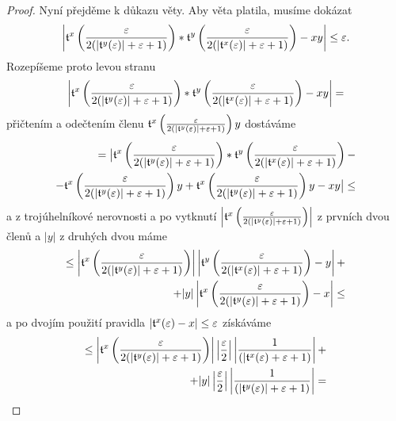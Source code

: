 \begin{theorem}
\begin{proof}
Nyní přejděme k důkazu věty. Aby věta platila, musíme dokázat
\begin{equation}
\left| \mathfrak{t}^{x}\left(\frac{\varepsilon}{2(|\mathfrak{t}^{y}(\varepsilon)|+\varepsilon +1)}\right) *\mathfrak{t}^{y}\left(\frac{\varepsilon}{2(|\mathfrak{t}^{x}(\varepsilon)|+\varepsilon +1)}\right) -xy \right|\leq\varepsilon.
\end{equation}
Rozepíšeme proto levou stranu
\begin{equation}
\left| \mathfrak{t}^{x}\left(\frac{\varepsilon}{2(|\mathfrak{t}^{y}(\varepsilon)|+\varepsilon +1)}\right) *\mathfrak{t}^{y}\left(\frac{\varepsilon}{2(|\mathfrak{t}^{x}(\varepsilon)|+\varepsilon +1)}\right) -xy \right| =
\end{equation}
přičtením a odečtením členu $\mathfrak{t}^{x}\left(\frac{\varepsilon}{2(|\mathfrak{t}^{y}(\varepsilon)|+\varepsilon +1)} \right)y$ dostáváme
\begin{equation}
\begin{split}=\bigl\vert \mathfrak{t}^{x}\left(\frac{\varepsilon}{2(|\mathfrak{t}^{y}(\varepsilon)|+\varepsilon +1)}\right) *\mathfrak{t}^{y}\left(\frac{\varepsilon}{2(|\mathfrak{t}^{x}(\varepsilon)|+\varepsilon +1)}\right) -&
\\-\mathfrak{t}^{x}\left(\frac{\varepsilon}{2(|\mathfrak{t}^{y}(\varepsilon)|+\varepsilon +1)} \right)y + \mathfrak{t}^{x}\left(\frac{\varepsilon}{2(|\mathfrak{t}^{y}(\varepsilon)|+\varepsilon +1)} \right)y -xy \bigr\vert \leq&
\end{split}
\end{equation}
a z trojúhelníkové nerovnosti a po vytknutí $\left|\mathfrak{t}^{x}\left(\frac{\varepsilon}{2(|\mathfrak{t}^{y}(\varepsilon)|+\varepsilon +1)}\right)\right|$ z prvních dvou členů a $|y|$ z druhých dvou máme
\begin{equation}
\begin{split}
\leq\left|\mathfrak{t}^{x}\left(\frac{\varepsilon}{2(|\mathfrak{t}^{y}(\varepsilon)|+\varepsilon +1)}\right)\right|\left|\mathfrak{t}^{y}\left(\frac{\varepsilon}{2(|\mathfrak{t}^{x}(\varepsilon)|+\varepsilon +1)}\right)-y\right|+\\+|y|\left|\mathfrak{t}^{x}\left(\frac{\varepsilon}{2(|\mathfrak{t}^{y}(\varepsilon)|+\varepsilon +1)}\right)-x\right|\leq
\end{split}
\end{equation}
a po dvojím použití pravidla $|\mathfrak{t}^{x}(\varepsilon)-x|\leq\varepsilon$ získáváme
\begin{equation}
\begin{split}
\leq\left|\tnum{x}\left(\frac{\varepsilon}{2(|\tnum{y}(\varepsilon)|+\varepsilon +1)}\right)\right|\left|\frac{\varepsilon}{2}\right|\left|\frac{1}{(|\tnum{x}(\varepsilon)+\varepsilon +1)}\right|+\\+|y|\left|\frac{\varepsilon}{2}\right|\left|\frac{1}{(|\tnum{y}(\varepsilon)|+\varepsilon +1)}\right|=

\end{split}
\end{equation}
\end{proof}
\end{theorem}

